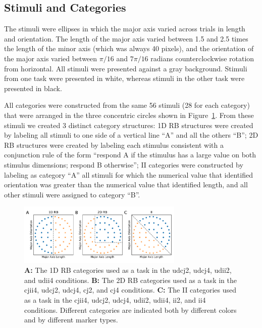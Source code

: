 \documentclass[doc, floatsintext]{apa7}
\begin{document}
\subsection{Stimuli and Categories}
The stimuli were ellipses in which the major axis varied
across trials in length and orientation. The length of the
major axis varied between 1.5 and 2.5 times the length of
the minor axis (which was always 40 pixels), and the
orientation of the major axis varied between $\pi/16$ and
$7\pi/16$ radians counterclockwise rotation from horizontal.
All stimuli were presented against a gray background.
Stimuli from one task were presented in white, whereas
stimuli in the other task were presented in black.

All categories were constructed from the same 56 stimuli (28
for each category) that were arranged in the three
concentric circles shown in Figure~\ref{fig_1}. From these
stimuli we created 3 distinct category structures: 1D RB
structures were created by labeling all stimuli to one side
of a vertical line ``A'' and all the others ``B''; 2D RB
structures were created by labeling each stimulus consistent
with a conjunction rule of the form ``respond A if the
stimulus has a large value on both stimulus dimensions;
respond B otherwise''; II categories were constructed by
labeling as category ``A'' all stimuli for which the
numerical value that identified orientation was greater than
the numerical value that identified length, and all other
stimuli were assigned to category ``B''.

\begin{figure}[h!]
    \centering
    \includegraphics[width=0.7\textwidth]{../figures/fig_1.pdf}
    \caption{
        \textbf{A:} The 1D RB categories used as a task in the
        udcj2, udcj4, udii2, and udii4 conditions. 
        \textbf{B:} The 2D RB categories used as a task in the
        cjii4, udcj2, udcj4, cj2, and cj4 conditions. 
        \textbf{C:} The II categories used as a task in the
        cjii4, udcj2, udcj4, udii2, udii4, ii2, and ii4
        conditions. 
        Different categories are indicated both by different
        colors and by different marker types.
    }
    \label{fig_1}
\end{figure}
\end{document}
